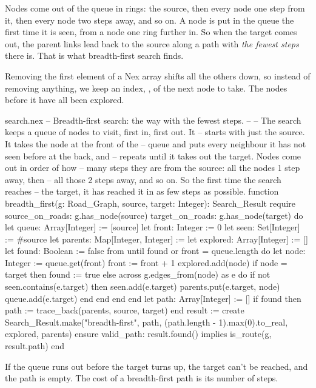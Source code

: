 Nodes come out of the queue in rings: the source, then every node one step
from it, then every node two steps away, and so on. A node is put in the
queue the first time it is seen, from a node one ring further in. So when
the target comes out, the parent links lead back to the source along a
path with \emph{the fewest steps} there is. That is what breadth-first
search finds.

Removing the first element of a Nex array shifts all the others down, so
instead of removing anything, we keep an index, , of the next
node to take. The nodes before it have all been explored.

\begin{append}{search.nex}
-- Breadth-first search: the way with the fewest steps.
--
-- The search keeps a queue of nodes to visit, first in, first out. It
-- starts with just the source. It takes the node at the front of the
-- queue and puts every neighbour it has not seen before at the back, and
-- repeats until it takes out the target. Nodes come out in order of how
-- many steps they are from the source: all the nodes 1 step away, then
-- all those 2 steps away, and so on. So the first time the search reaches
-- the target, it has reached it in as few steps as possible.
function breadth_first(g: Road_Graph, source, target: Integer): Search_Result
require
  source_on_roads: g.has_node(source)
  target_on_roads: g.has_node(target)
do
  let queue: Array[Integer] := [source]
  let front: Integer := 0
  let seen: Set[Integer] := #{source}
  let parents: Map[Integer, Integer] := {}
  let explored: Array[Integer] := []
  let found: Boolean := false
  from
  until
    found or front = queue.length
  do
    let node: Integer := queue.get(front)
    front := front + 1
    explored.add(node)
    if node = target then
      found := true
    else
      across g.edges_from(node) as e do
        if not seen.contains(e.target) then
          seen.add(e.target)
          parents.put(e.target, node)
          queue.add(e.target)
        end
      end
    end
  end
  let path: Array[Integer] := []
  if found then
    path := trace_back(parents, source, target)
  end
  result := create Search_Result.make("breadth-first", path,
    (path.length - 1).max(0).to_real, explored, parents)
ensure
  valid_path: result.found() implies is_route(g, result.path)
end
\end{append}

If the queue runs out before the target turns up, the target can't be
reached, and the path is empty. The cost of a breadth-first path is its
number of steps.

